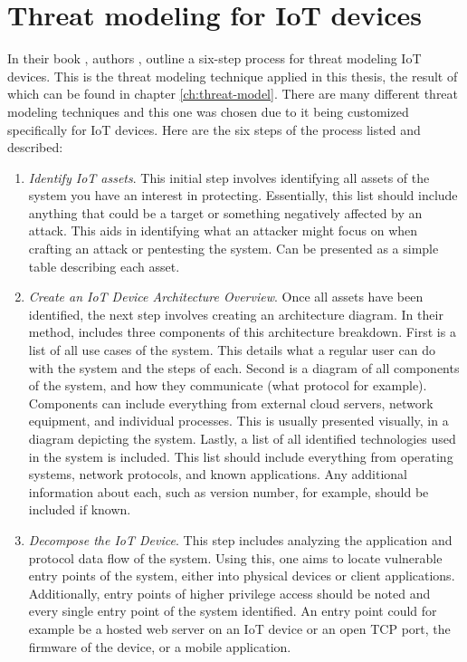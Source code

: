 \section{Threat modeling for IoT devices} \label{ch:method:threat-modeling}
In their book , authors \citeauthor{guzman2017iot}, outline a six-step process for threat modeling IoT devices. This is the threat modeling technique applied in this thesis, the result of which can be found in chapter \ref{ch:threat-model}. There are many different threat modeling techniques and this one was chosen due to it being customized specifically for IoT devices. Here are the six steps of the process listed and described:
\begin{enumerate}
    \item \textit{Identify IoT assets}. This initial step involves identifying all assets of the system you have an interest in protecting. Essentially, this list should include anything that could be a target or something negatively affected by an attack. This aids in identifying what an attacker might focus on when crafting an attack or pentesting the system. Can be presented as a simple table describing each asset.
    \item \textit{Create an IoT Device Architecture Overview}. Once all assets have been identified, the next step involves creating an architecture diagram. In their method, \citeauthor{guzman2017iot} includes three components of this architecture breakdown. First is a list of all use cases of the system. This details what a regular user can do with the system and the steps of each. Second is a diagram of all components of the system, and how they communicate (what protocol for example). Components can include everything from external cloud servers, network equipment, and individual processes. This is usually presented visually, in a diagram depicting the system. Lastly, a list of all identified technologies used in the system is included. This list should include everything from operating systems, network protocols, and known applications. Any additional information about each, such as version number, for example, should be included if known.
    \item \textit{Decompose the IoT Device}. This step includes analyzing the application and protocol data flow of the system. Using this, one aims to locate vulnerable entry points of the system, either into physical devices or client applications. Additionally, entry points of higher privilege access should be noted and every single entry point of the system identified. An entry point could for example be a hosted web server on an IoT device or an open TCP port, the firmware of the device, or a mobile application.

\end{enumerate}
